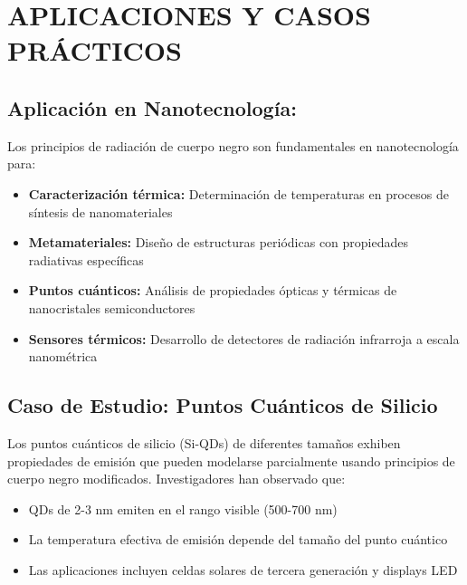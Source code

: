 \documentclass[12pt,a4paper]{article}
\begin{document}
	\section{APLICACIONES Y CASOS PRÁCTICOS}
	
	\subsection{Aplicación en Nanotecnología:}
	
	Los principios de radiación de cuerpo negro son fundamentales en nanotecnología para:
	
	\begin{itemize}
		\item \textbf{Caracterización térmica:} Determinación de temperaturas en procesos de síntesis de nanomateriales
		\item \textbf{Metamateriales:} Diseño de estructuras periódicas con propiedades radiativas específicas
		\item \textbf{Puntos cuánticos:} Análisis de propiedades ópticas y térmicas de nanocristales semiconductores
		\item \textbf{Sensores térmicos:} Desarrollo de detectores de radiación infrarroja a escala nanométrica
	\end{itemize}
	
	\subsection{Caso de Estudio: Puntos Cuánticos de Silicio}
	
	Los puntos cuánticos de silicio (Si-QDs) de diferentes tamaños exhiben propiedades de emisión que pueden modelarse parcialmente usando principios de cuerpo negro modificados. Investigadores han observado que:
	
	\begin{itemize}
		\item QDs de 2-3 nm emiten en el rango visible (500-700 nm)
		\item La temperatura efectiva de emisión depende del tamaño del punto cuántico
		\item Las aplicaciones incluyen celdas solares de tercera generación y displays LED
	\end{itemize}
	
\end{document}
